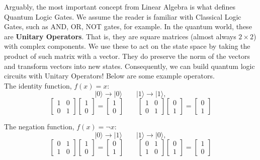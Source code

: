 \documentclass[letterpaper, 10 pt, conference]{ieeeconf}
\begin{document}
Arguably, the most important concept from Linear Algebra is what defines Quantum Logic Gates.  We assume the reader is familiar with Classical Logic Gates, such as AND, OR, NOT gates, for example.  In the quantum world, these are \textbf{Unitary Operators}.  That is, they are square matrices (almost always \( 2 \times 2\)) with complex components.  We use these to act on the state space by taking the product of such matrix with a vector.  They do preserve the norm of the vectors and transform vectors into new states.  Consequently, we can build quantum logic circuits with Unitary Operators!  Below are some example operators.\\

The identity function, \( f(x) = x \):
\[
|0\rangle \to |0\rangle \quad \quad |1\rangle \to |1\rangle,
\]
\[
\begin{bmatrix}
1 & 0 \\
0 & 1
\end{bmatrix}
\begin{bmatrix} 1 \\ 0 \end{bmatrix} =
\begin{bmatrix} 1 \\ 0 \end{bmatrix}
\quad \quad
\begin{bmatrix}
1 & 0 \\
0 & 1
\end{bmatrix}
\begin{bmatrix} 0 \\ 1 \end{bmatrix} =
\begin{bmatrix} 0 \\ 1 \end{bmatrix}
\]

The negation function, \( f(x) = \neg x \):
\[
|0\rangle \to |1\rangle \quad \quad |1\rangle \to |0\rangle,
\]
\[
\begin{bmatrix}
0 & 1 \\
1 & 0
\end{bmatrix}
\begin{bmatrix} 1 \\ 0 \end{bmatrix} =
\begin{bmatrix} 0 \\ 1 \end{bmatrix}
\quad \quad
\begin{bmatrix}
0 & 1 \\
1 & 0
\end{bmatrix}
\begin{bmatrix} 0 \\ 1 \end{bmatrix} =
\begin{bmatrix} 1 \\ 0 \end{bmatrix}
\]
\end{document}
